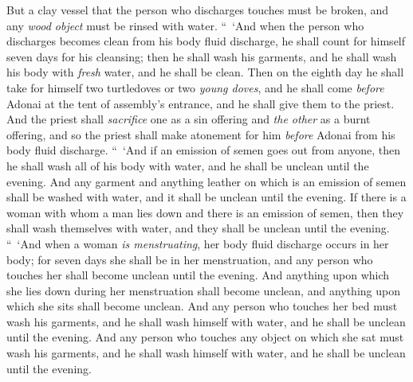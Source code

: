 \begin{biblechapter}
\verse But a clay vessel that the person who discharges touches must be broken, and any \textit{wood object} must be rinsed with water.
\verse “ ‘And when the person who discharges becomes clean from his body fluid discharge, he shall count for himself seven days for his cleansing; then he shall wash his garments, and he shall wash his body with \textit{fresh} water, and he shall be clean.
\verse Then on the eighth day he shall take for himself two turtledoves or two \textit{young doves}, and he shall come \textit{before} Adonai at the tent of assembly’s entrance, and he shall give them to the priest.
\verse And the priest shall \textit{sacrifice} one as a sin offering and \textit{the other} as a burnt offering, and so the priest shall make atonement for him \textit{before} Adonai from his body fluid discharge.
\verse “ ‘And if an emission of semen goes out from anyone, then he shall wash all of his body with water, and he shall be unclean until the evening.
\verse And any garment and anything leather on which is an emission of semen shall be washed with water, and it shall be unclean until the evening.
\verse If there is a woman with whom a man lies down and there is an emission of semen, then they shall wash themselves with water, and they shall be unclean until the evening.
\verse “ ‘And when a woman \textit{is menstruating}, her body fluid discharge occurs in her body; for seven days she shall be in her menstruation, and any person who touches her shall become unclean until the evening.
\verse And anything upon which she lies down during her menstruation shall become unclean, and anything upon which she sits shall become unclean.
\verse And any person who touches her bed must wash his garments, and he shall wash himself with water, and he shall be unclean until the evening.
\verse And any person who touches any object on which she sat must wash his garments, and he shall wash himself with water, and he shall be unclean until the evening.

\end{biblechapter}
